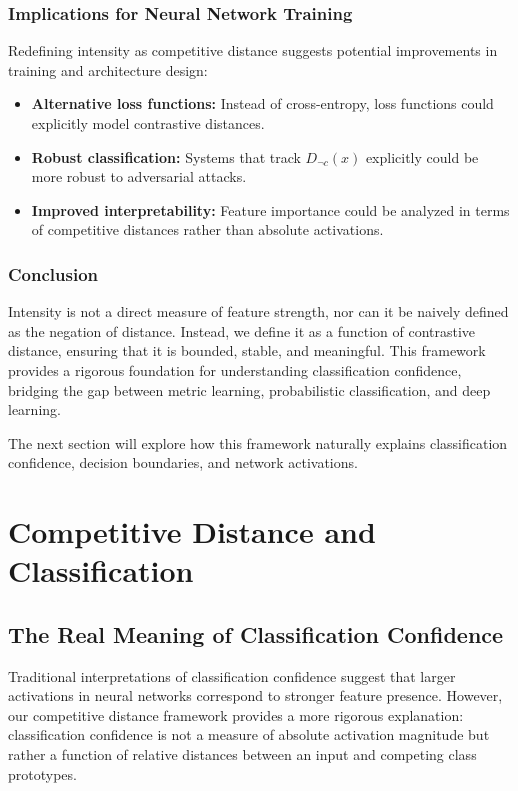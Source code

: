 \documentclass[12pt]{article}
\begin{document}
\subsubsection{Implications for Neural Network Training}

Redefining intensity as competitive distance suggests potential improvements in training and architecture design:

\begin{itemize}
    \item \textbf{Alternative loss functions:} Instead of cross-entropy, loss functions could explicitly model contrastive distances.
    \item \textbf{Robust classification:} Systems that track \( D_{\neg c}(x) \) explicitly could be more robust to adversarial attacks.
    \item \textbf{Improved interpretability:} Feature importance could be analyzed in terms of competitive distances rather than absolute activations.
\end{itemize}

\subsubsection{Conclusion}

Intensity is not a direct measure of feature strength, nor can it be naively defined as the negation of distance. Instead, we define it as a function of contrastive distance, ensuring that it is bounded, stable, and meaningful. This framework provides a rigorous foundation for understanding classification confidence, bridging the gap between metric learning, probabilistic classification, and deep learning.

The next section will explore how this framework naturally explains classification confidence, decision boundaries, and network activations.


\section{Competitive Distance and Classification}
\subsection{The Real Meaning of Classification Confidence}

Traditional interpretations of classification confidence suggest that larger activations in neural networks correspond to stronger feature presence. However, our competitive distance framework provides a more rigorous explanation: classification confidence is not a measure of absolute activation magnitude but rather a function of relative distances between an input and competing class prototypes. 
\end{document}
